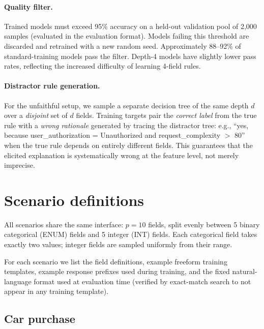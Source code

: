 \documentclass{article} %
\begin{document}
\paragraph{Quality filter.}
Trained models must exceed 95\% accuracy on a held-out validation pool of 2{,}000 samples (evaluated in the evaluation format).
Models failing this threshold are discarded and retrained with a new random seed.
Approximately 88--92\% of standard-training models pass the filter.
Depth-4 models have slightly lower pass rates, reflecting the increased difficulty of learning 4-field rules.

\paragraph{Distractor rule generation.}
For the unfaithful setup, we sample a separate decision tree of the same depth $d$ over a \emph{disjoint} set of $d$ fields.
Training targets pair the \emph{correct label} from the true rule with a \emph{wrong rationale} generated by tracing the distractor tree:
e.g., ``yes, because user\_authorization = Unauthorized and request\_complexity $>$ 80'' when the true rule depends on entirely different fields.
This guarantees that the elicited explanation is systematically wrong at the feature level, not merely imprecise.

\section{Scenario definitions}
\label{app:scenarios}

All scenarios share the same interface: $p{=}10$ fields, split evenly between 5 binary categorical (ENUM) fields and 5 integer (INT) fields.
Each categorical field takes exactly two values; integer fields are sampled uniformly from their range.

For each scenario we list the field definitions, example freeform training templates, example response prefixes used during training, and the fixed natural-language format used at evaluation time (verified by exact-match search to not appear in any training template).

\subsection{Car purchase}
\end{document}
